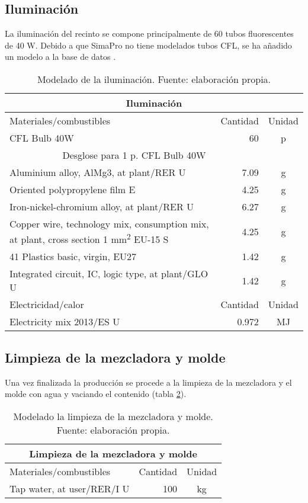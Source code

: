 \subsection{Iluminación}

La iluminación del recinto se compone principalmente de 60 tubos fluorescentes de 40 \si{W}. Debido a que SimaPro no tiene modelados tubos CFL, se ha añadido un modelo a la base de datos \cite{cflbulb}.

\begin{table}[!htb]
\centering
\begin{tabular}{p{8cm}rc}
\toprule
\multicolumn{3}{c}{Iluminación}\\
\midrule
Materiales/combustibles & Cantidad & Unidad\\
\midrule
CFL Bulb 40W & 60 & p\\
\multicolumn{2}{c}{Desglose para 1 p. CFL Bulb 40W}\\
\cmidrule(r){1-2}
Aluminium alloy, AlMg3, at plant/RER U & 7.09 & \si{g}\\
Oriented polypropylene film E & 4.25 & \si{g}\\
Iron-nickel-chromium alloy, at plant/RER U & 6.27 & \si{g}\\
Copper wire, technology mix, consumption mix, at plant, cross section 1 \si{mm^2} EU-15 S & 4.25 & \si{g}\\
41 Plastics basic, virgin, EU27 & 1.42 & \si{g}\\
Integrated circuit, IC, logic type, at plant/GLO U & 1.42 & \si{g}\\
\midrule
Electricidad/calor & Cantidad & Unidad\\
\midrule
Electricity mix 2013/ES U & 0.972 & \si{MJ}\\
\bottomrule
\end{tabular}
\caption[Modelado de la iluminación.]{Modelado de la iluminación. Fuente: elaboración propia.}
\label{modeladodeiluminacion}
\end{table}

\subsection{Limpieza de la mezcladora y molde}

Una vez finalizada la producción se procede a la limpieza de la mezcladora y el molde con agua y vaciando el contenido (tabla \ref{modeladolimpiezamezcladora}).

\begin{table}[!htb]
\centering
\begin{tabular}{p{8cm}rc}
\toprule
\multicolumn{3}{c}{Limpieza de la mezcladora y molde}\\
\midrule
Materiales/combustibles & Cantidad & Unidad\\
\midrule
Tap water, at user/RER/I U & 100 & \si{kg}\\
\bottomrule
\end{tabular}
\caption[Modelado la limpieza de la mezcladora y molde.]{Modelado la limpieza de la mezcladora y molde. Fuente: elaboración propia.}
\label{modeladolimpiezamezcladora}
\end{table}

